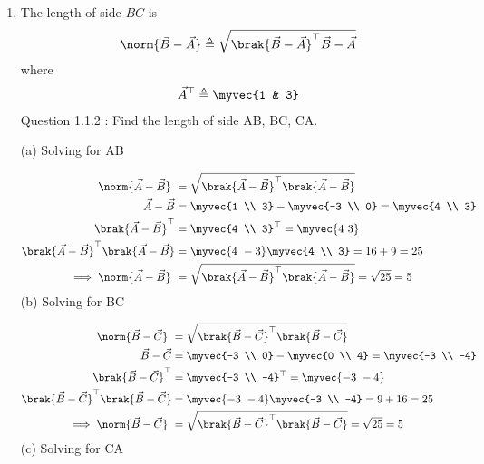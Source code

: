 \documentclass[11pt]{book}
\begin{document}
\begin{enumerate}[label=\thesection.\arabic*.,ref=\thesection.\theenumi]
\item The length of side $BC$ is 
		\begin{align}
			\norm{\vec{B}-\vec{A}} \triangleq \sqrt{\brak{\vec{B}-\vec{A}}^{\top}{\vec{B}-\vec{A}}}
		\end{align}
		where
		\begin{align}
			\vec{A}^{\top}\triangleq\myvec{1 & 3}
		\end{align}
Question 1.1.2 : Find the length of side AB, BC, CA.\\
\solution
 
 
 (a) 
 Solving for AB
 
  \begin{align}
 \norm{\vec{A}-\vec{B}}\ &=  \sqrt{\brak{\vec{A}-\vec{B}}^{\top}\brak{\vec{A}-\vec{B}}} \\
 \vec{A}-\vec{B} &= \myvec{1 \\ 3} - \myvec{-3 \\ 0} = \myvec{4 \\ 3} \\
 \brak{\vec{A}-\vec{B}}^{\top} &= {\myvec{4 \\ 3}}^{\top} = \myvec{4 \ 3} \\
\brak{\vec{A}-\vec{B}}^{\top}\brak{\vec{A}-\vec{B}} &= \myvec{4 \ -3} \myvec{4 \\ 3} = 16+9 = 25 \\  
 \implies \norm{\vec{A}-\vec{B}}\ &=\sqrt{\brak{\vec{A}-\vec{B}}^{\top}\brak{\vec{A}-\vec{B}}} = \sqrt{25} = 5
\end{align}
(b)
Solving for BC 
 
  \begin{align}
 \norm{\vec{B}-\vec{C}}\ &=  \sqrt{\brak{\vec{B}-\vec{C}}^{\top}\brak{\vec{B}-\vec{C}}} \\
 \vec{B}-\vec{C} &= \myvec{-3 \\ 0} - \myvec{0 \\ 4} = \myvec{-3 \\ -4} \\
 \brak{\vec{B}-\vec{C}}^{\top} &= {\myvec{-3 \\ -4}}^{\top} = \myvec{-3 \ -4} \\
\brak{\vec{B}-\vec{C}}^{\top}\brak{\vec{B}-\vec{C}} &= \myvec{-3 \ -4} \myvec{-3 \\ -4} = 9+16 = 25 \\  
 \implies \norm{\vec{B}-\vec{C}}\ &=\sqrt{\brak{\vec{B}-\vec{C}}^{\top}\brak{\vec{B}-\vec{C}}} = \sqrt{25}	= 5 
\end{align}
(c)
Solving for CA


\end{enumerate}
\end{document}
